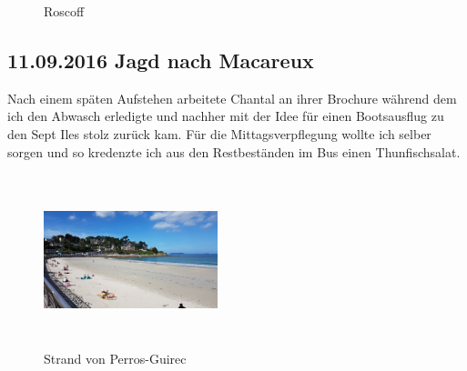\begin{figure}[H]
   \centering
   \quad
   \quad
   \quad
   \caption[Roscoff]{Roscoff}
\end{figure}

\subsection{11.09.2016 Jagd nach Macareux}
Nach einem späten Aufstehen arbeitete Chantal an ihrer Brochure während dem ich den Abwasch erledigte und nachher mit der Idee für einen Bootsausflug zu den Sept Iles stolz zurück kam.
Für die Mittagsverpflegung wollte ich selber sorgen und so kredenzte ich aus den Restbeständen im Bus einen Thunfischsalat.

\begin{figure} 
  \begin{centering}
    \includegraphics[width=0.45\textwidth, height=5cm, keepaspectratio]{../Bilder/Bretagne/73.jpg}
    \caption{Strand von Perros-Guirec}
  \end{centering}
\end{figure} 


